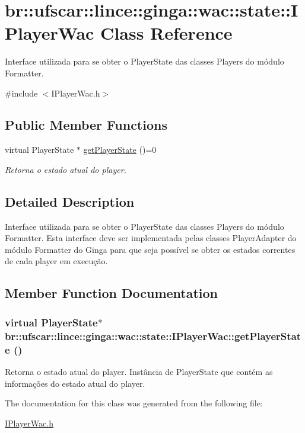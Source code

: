 \hypertarget{classbr_1_1ufscar_1_1lince_1_1ginga_1_1wac_1_1state_1_1IPlayerWac}{
\section{br::ufscar::lince::ginga::wac::state::IPlayerWac Class Reference}
\label{classbr_1_1ufscar_1_1lince_1_1ginga_1_1wac_1_1state_1_1IPlayerWac}
}


Interface utilizada para se obter o PlayerState das classes Players do módulo Formatter.  


{\ttfamily \#include $<$IPlayerWac.h$>$}\subsection*{Public Member Functions}
\begin{DoxyCompactItemize}
\item 
virtual PlayerState $\ast$ \hyperlink{classbr_1_1ufscar_1_1lince_1_1ginga_1_1wac_1_1state_1_1IPlayerWac_afcadf166ea36150534a0bfa037a384c0}{getPlayerState} ()=0
\begin{DoxyCompactList}\small\item\em Retorna o estado atual do player. \item\end{DoxyCompactList}\end{DoxyCompactItemize}


\subsection{Detailed Description}
Interface utilizada para se obter o PlayerState das classes Players do módulo Formatter. Esta interface deve ser implementada pelas classes PlayerAdapter do módulo Formatter do Ginga para que seja possível se obter os estados correntes de cada player em execução. 

\subsection{Member Function Documentation}
\hypertarget{classbr_1_1ufscar_1_1lince_1_1ginga_1_1wac_1_1state_1_1IPlayerWac_afcadf166ea36150534a0bfa037a384c0}{
\subsubsection[{getPlayerState}]{\setlength{\rightskip}{0pt plus 5cm}virtual PlayerState$\ast$ br::ufscar::lince::ginga::wac::state::IPlayerWac::getPlayerState ()}}
\label{classbr_1_1ufscar_1_1lince_1_1ginga_1_1wac_1_1state_1_1IPlayerWac_afcadf166ea36150534a0bfa037a384c0}


Retorna o estado atual do player. Instância de PlayerState que contém as informações do estado atual do player. 

The documentation for this class was generated from the following file:\begin{DoxyCompactItemize}
\item 
\hyperlink{IPlayerWac_8h}{IPlayerWac.h}\end{DoxyCompactItemize}
